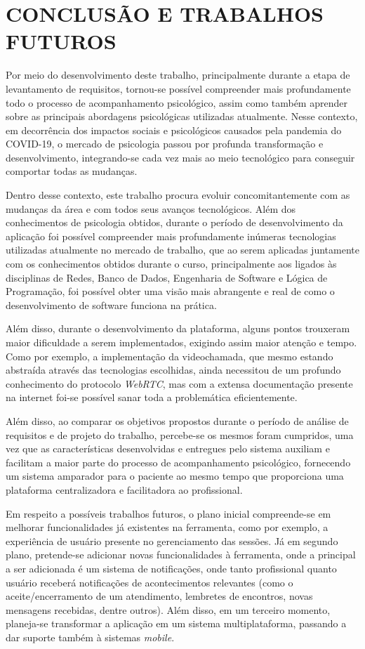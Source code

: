 \chapter{CONCLUSÃO E TRABALHOS FUTUROS}
\label{chap:conclusao}

Por meio do desenvolvimento deste trabalho, principalmente durante a etapa de levantamento de requisitos, tornou-se possível compreender mais profundamente todo o processo de acompanhamento psicológico, assim como também aprender sobre as principais abordagens psicológicas utilizadas atualmente. Nesse contexto, em decorrência dos impactos sociais e psicológicos causados pela pandemia do COVID-19, o mercado de psicologia passou por profunda transformação e desenvolvimento, integrando-se cada vez mais ao meio tecnológico para conseguir comportar todas as mudanças.

Dentro desse contexto, este trabalho procura evoluir concomitantemente com as mudanças da área e com todos seus avanços tecnológicos. Além dos conhecimentos de psicologia obtidos, durante o período de desenvolvimento da aplicação foi possível compreender mais profundamente inúmeras tecnologias utilizadas atualmente no mercado de trabalho, que ao serem aplicadas juntamente com os conhecimentos obtidos durante o curso, principalmente aos ligados às disciplinas de Redes, Banco de Dados, Engenharia de Software e Lógica de Programação, foi possível obter uma visão mais abrangente e real de como o desenvolvimento de software funciona na prática.

Além disso, durante o desenvolvimento da plataforma, alguns pontos trouxeram maior dificuldade a serem implementados, exigindo assim maior atenção e tempo. Como por exemplo, a implementação da videochamada, que mesmo estando abstraída através das tecnologias escolhidas, ainda necessitou de um profundo conhecimento do protocolo \textit{WebRTC},  mas com a extensa documentação presente na internet foi-se possível sanar toda a problemática eficientemente.

Além disso, ao comparar os objetivos propostos durante o período de análise de requisitos e de projeto do trabalho, percebe-se os mesmos foram cumpridos, uma vez que as características desenvolvidas e entregues pelo sistema auxiliam e facilitam a maior parte do processo de acompanhamento psicológico, fornecendo um sistema amparador para o paciente ao mesmo tempo que proporciona uma plataforma centralizadora e facilitadora ao profissional.

Em respeito a possíveis trabalhos futuros, o plano inicial compreende-se em melhorar funcionalidades já existentes na ferramenta, como por exemplo, a experiência de usuário presente no gerenciamento das sessões. Já em segundo plano, pretende-se adicionar novas funcionalidades à ferramenta, onde a principal a ser adicionada é um sistema de notificações, onde tanto profissional quanto usuário receberá notificações de acontecimentos relevantes (como o aceite/encerramento de um atendimento, lembretes de encontros, novas mensagens recebidas, dentre outros). Além disso, em um terceiro momento, planeja-se transformar a aplicação em um sistema multiplataforma, passando a dar suporte também à sistemas \textit{mobile}.

